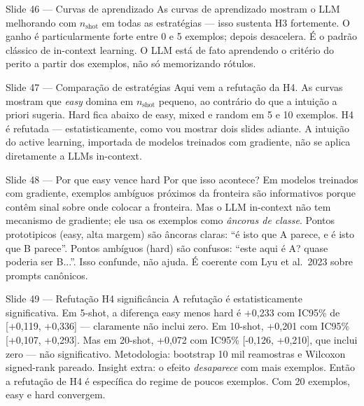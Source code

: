 \documentclass[aspectratio=169,10pt]{beamer}
\begin{document}
\begin{frame}{Slide 46 --- Curvas de aprendizado}
\footnotesize
As curvas de aprendizado mostram o LLM melhorando com $n_{\text{shot}}$ em todas as estrat\'egias --- isso sustenta H3 fortemente. O ganho \'e particularmente forte entre 0 e 5 exemplos; depois desacelera. \'E o padr\~ao cl\'assico de in-context learning. O LLM est\'a de fato aprendendo o crit\'erio do perito a partir dos exemplos, n\~ao s\'o memorizando r\'otulos.
\end{frame}

\begin{frame}{Slide 47 --- Compara\c{c}\~ao de estrat\'egias}
\footnotesize
Aqui vem a refuta\c{c}\~ao da H4. As curvas mostram que \emph{easy} domina em $n_{\text{shot}}$ pequeno, ao contr\'ario do que a intui\c{c}\~ao a priori sugeria. Hard fica abaixo de easy, mixed e random em 5 e 10 exemplos. H4 \'e refutada --- estatisticamente, como vou mostrar dois slides adiante. A intui\c{c}\~ao do active learning, importada de modelos treinados com gradiente, n\~ao se aplica diretamente a LLMs in-context.
\end{frame}

\begin{frame}{Slide 48 --- Por que easy vence hard}
\footnotesize
Por que isso acontece? Em modelos treinados com gradiente, exemplos amb\'iguos pr\'oximos da fronteira s\~ao informativos porque cont\^em sinal sobre onde colocar a fronteira. Mas o LLM in-context n\~ao tem mecanismo de gradiente; ele usa os exemplos como \emph{\^ancoras de classe}. Pontos prototipicos (easy, alta margem) s\~ao \^ancoras claras: ``\'e isto que A parece, e \'e isto que B parece''. Pontos amb\'iguos (hard) s\~ao confusos: ``este aqui \'e A? quase poderia ser B...''. Isso confunde, n\~ao ajuda. \'E coerente com Lyu et al.\ 2023 sobre prompts can\^onicos.
\end{frame}

\begin{frame}{Slide 49 --- Refuta\c{c}\~ao H4 signific\^ancia}
\footnotesize
A refuta\c{c}\~ao \'e estatisticamente significativa. Em 5-shot, a diferen\c{c}a easy menos hard \'e +0{,}233 com IC95\% de [+0{,}119, +0{,}336] --- claramente n\~ao inclui zero. Em 10-shot, +0{,}201 com IC95\% [+0{,}107, +0{,}293]. Mas em 20-shot, +0{,}072 com IC95\% [-0{,}126, +0{,}210], que inclui zero --- n\~ao significativo. Metodologia: bootstrap 10 mil reamostras e Wilcoxon signed-rank pareado. Insight extra: o efeito \emph{desaparece} com mais exemplos. Ent\~ao a refuta\c{c}\~ao de H4 \'e espec\'ifica do regime de poucos exemplos. Com 20 exemplos, easy e hard convergem.
\end{frame}
\end{document}
